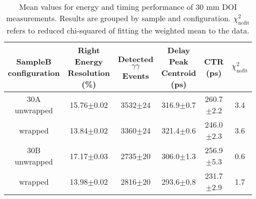 \begin{table}
\caption{\label{tab:doictrresults} Mean values for energy and timing performance of 30 mm DOI measurements. Results are grouped by sample and configuration. $\chi^2_\text{nofit}$ refers to reduced chi-squared of fitting the weighted mean to the data.}
\begin{tabular}{cccccc}
\hline
SampleB configuration & Right Energy Resolution (\%) & Detected $\gamma\gamma$ Events & Delay Peak Centroid (ps)  & CTR (ps) &  $\chi^2_\text{nofit}$ \\
\hline
30A     unwrapped     &  15.76$\pm$0.02 &  3532$\pm$24 &  316.9$\pm$0.7 &  260.7$\pm$2.2 &    3.4 \\
        wrapped       &  13.84$\pm$0.02 &  3360$\pm$24 &  321.4$\pm$0.6 &  246.0$\pm$2.3 &    3.6 \\
30B     unwrapped     &  17.17$\pm$0.03 &  2735$\pm$20 &  306.0$\pm$1.3 &  256.9$\pm$5.3 &    0.6 \\
        wrapped       &  13.98$\pm$0.02 &  2816$\pm$20 &  293.6$\pm$0.8 &  231.7$\pm$2.9 &    1.7 \\
\hline
\end{tabular}
\end{table}

